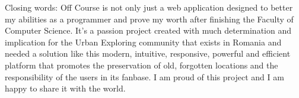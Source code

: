 \documentclass[12pt,a4paper]{report}
\begin{document}
Closing words: Off Course is not only just a web application designed to better my abilities as a programmer and prove my worth after finishing the Faculty of Computer Science. It's a passion project created with much determination and implication for the Urban Exploring community that exists in Romania and needed a solution like this modern, intuitive, responsive, powerful and efficient platform that promotes the preservation of old, forgotten locations and the responsibility of the users in its fanbase. I am proud of this project and I am happy to share it with the world.



\end{document}
